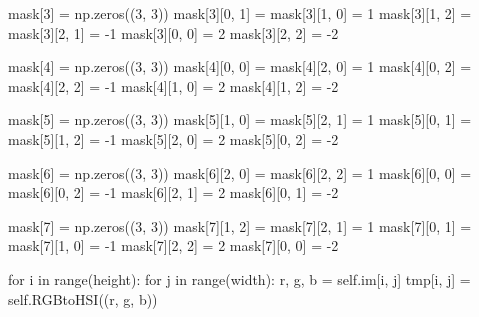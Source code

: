 \documentclass[final,a4paper,openany,12pt]{mwbk}
\begin{document}
mask[3] = np.zeros((3, 3)) \newline
\indent mask[3][0, 1] = mask[3][1, 0] = 1 \newline
\indent mask[3][1, 2] = mask[3][2, 1] = -1 \newline
\indent mask[3][0, 0] = 2 \newline
\indent mask[3][2, 2] = -2 \newline

\indent mask[4] = np.zeros((3, 3)) \newline
\indent mask[4][0, 0] = mask[4][2, 0] = 1 \newline
\indent mask[4][0, 2] = mask[4][2, 2] = -1 \newline
\indent mask[4][1, 0] = 2 \newline
\indent mask[4][1, 2] = -2 \newline

\indent mask[5] = np.zeros((3, 3)) \newline
\indent mask[5][1, 0] = mask[5][2, 1] = 1 \newline
\indent \indent \indent mask[5][0, 1] = mask[5][1, 2] = -1 \newline
\indent \indent \indent mask[5][2, 0] = 2 \newline
\indent \indent \indent mask[5][0, 2] = -2 \newline

\indent \indent \indent mask[6] = np.zeros((3, 3)) \newline
\indent \indent \indent mask[6][2, 0] = mask[6][2, 2] = 1 \newline
\indent \indent \indent mask[6][0, 0] = mask[6][0, 2] = -1 \newline
\indent \indent \indent mask[6][2, 1] = 2 \newline
\indent \indent \indent mask[6][0, 1] = -2 \newline

\indent \indent \indent mask[7] = np.zeros((3, 3)) \newline
\indent \indent \indent mask[7][1, 2] = mask[7][2, 1] = 1 \newline
\indent \indent \indent mask[7][0, 1] = mask[7][1, 0] = -1 \newline
\indent \indent \indent mask[7][2, 2] = 2 \newline
\indent \indent \indent mask[7][0, 0] = -2 \newline

\indent \indent \indent for i in range(height): \newline
\indent \indent \indent for j in range(width): \newline
\indent \indent \indent r, g, b = self.im[i, j] \newline
\indent \indent \indent tmp[i, j] = self.RGBtoHSI((r, g, b)) \newline
\end{document}
